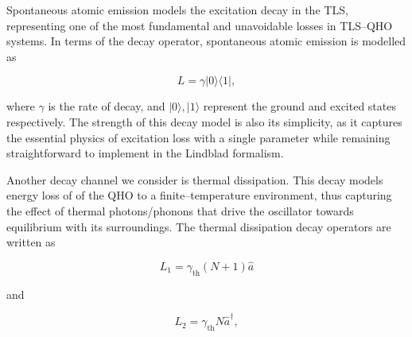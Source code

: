\documentclass[12pt]{article}
\begin{document}
Spontaneous atomic emission models the excitation decay in the TLS, representing one of the most fundamental and unavoidable losses in TLS--QHO systems. In terms of the decay operator, spontaneous atomic emission is modelled as

\begin{equation} \label{eqn:L_spont}
    L = \gamma|0\rangle\langle1|,
\end{equation}

where $\gamma$ is the rate of decay, and $|0\rangle,|1\rangle$ represent the ground and excited states respectively. The strength of this decay model is also its simplicity, as it captures the essential physics of excitation loss with a single parameter while remaining straightforward to implement in the Lindblad formalism.

Another decay channel we consider is thermal dissipation. This decay models energy loss of of the QHO to a finite--temperature environment, thus capturing the effect of thermal photons/phonons that drive the oscillator towards equilibrium with its surroundings. The thermal dissipation decay operators are written as 

\begin{equation}\label{eqn:L_therm}
    L_1 = \gamma_{\scriptscriptstyle \text{th}}(N+1)\hat{a} 
\end{equation}

and 

\begin{equation*}
    L_2 = \gamma_{\scriptscriptstyle \text{th}}N\hat{a}^\dagger ,
\end{equation*}
\end{document}
